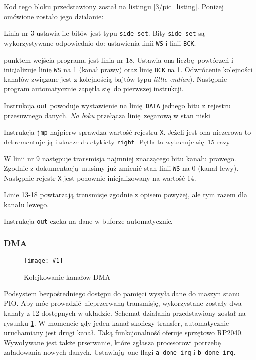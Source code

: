 \documentclass[12pt]{report}
\let\tempone\itemize
\let\temptwo\enditemize
\renewenvironment{itemize}{\tempone\setlength{\itemsep}{0cm}}{\temptwo}
\newcommand{\imgint}[4]{
	\begin{figure}[{#4}]
		\centering
		\texttt{[image: \#1]}
		\caption{#2}
		\label{#1}
	\end{figure}
}
\newcommand{\imgcs}[3]{\imgint{#1}{#2}{#3}{}}
\begin{document}
		Kod tego bloku przedstawiony został na listingu \ref{3/pio_listing}. Poniżej omówione zostało jego działanie:
		\begin{itemize}
			\item Linia nr 3 ustawia ile bitów jest typu \lstinline|side-set|. Bity \lstinline|side-set| są wykorzystywane odpowiednio do: ustawienia linii \lstinline|WS| i linii \lstinline|BCK|.
			
			\item punktem wejścia programu jest linia nr 18. Ustawia ona liczbę powtórzeń i inicjalizuje linię \lstinline|WS| na 1 (kanał prawy) oraz linię \lstinline|BCK| na 1. Odwrócenie kolejności kanałów związane jest z kolejnością bajtów typu \textit{little-endian}). Następnie program automatycznie zapętla się do pierwszej instrukcji.
			
			\item Instrukcja \lstinline|out| powoduje wystawienie na linię \lstinline|DATA| jednego bitu z rejestru przesuwnego danych. \textit{Na boku} przełącza linię zegarową w stan niski
			
			\item Instrukcja \lstinline|jmp| najpierw sprawdza wartość rejestru \lstinline|X|. Jeżeli jest ona niezerowa to dekrementuje ją i skacze do etykiety \lstinline|right|. Pętla ta wykonuje się 15 razy.
			
			\item W linii nr 9 następuje transmisja najmniej znaczącego bitu kanału prawego. Zgodnie z dokumentacją musimy już zmienić stan linii \lstinline|WS| na 0 (kanał lewy). Następnie rejestr \lstinline|X| jest ponownie inicjalizowany na wartość 14.
			
			\item Linie 13-18 powtarzają transmisje zgodnie z opisem powyżej, ale tym razem dla kanału lewego.
		\end{itemize}
		
		Instrukcja \lstinline|out| czeka na dane w buforze automatycznie.
	
	\subsubsection{DMA}
		\imgcs{3/dma_chain}{Kolejkowanie kanałów DMA}{0.55}
		Podsystem bezpośredniego dostępu do pamięci wysyła dane do maszyn stanu PIO. Aby móc prowadzić nieprzerwaną transmisję, wykorzystane zostały dwa kanały z 12 dostępnych w układzie. Schemat działania przedstawiony został na rysunku \ref{3/dma_chain}. W momencie gdy jeden kanał skończy transfer, automatycznie uruchamiany jest drugi kanał. Taką funkcjonalność oferuje sprzętowo RP2040. Wywoływane jest także przerwanie, które zgłasza procesorowi potrzebę załadowania nowych danych. Ustawiają one flagi \lstinline|a_done_irq| i \lstinline|b_done_irq|.
		$ $\\
			
\end{document}
